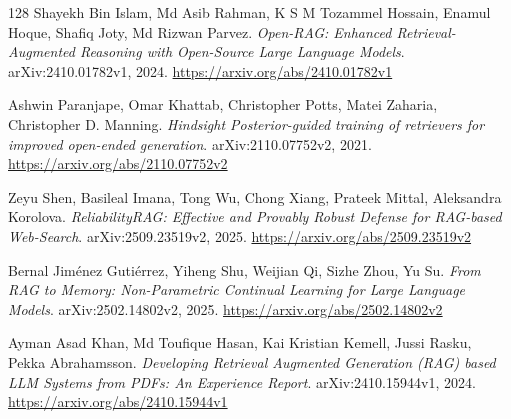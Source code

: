 \documentclass[11pt,a4paper]{article}
\begin{document}
\begin{thebibliography}{128}
Shayekh Bin Islam, Md Asib Rahman, K S M Tozammel Hossain, Enamul Hoque, Shafiq Joty, Md Rizwan Parvez.
\newblock \emph{Open-RAG: Enhanced Retrieval-Augmented Reasoning with Open-Source Large Language Models}.
\newblock arXiv:2410.01782v1, 2024.
\newblock \url{https://arxiv.org/abs/2410.01782v1}

Ashwin Paranjape, Omar Khattab, Christopher Potts, Matei Zaharia, Christopher D. Manning.
\newblock \emph{Hindsight Posterior-guided training of retrievers for improved open-ended generation}.
\newblock arXiv:2110.07752v2, 2021.
\newblock \url{https://arxiv.org/abs/2110.07752v2}

Zeyu Shen, Basileal Imana, Tong Wu, Chong Xiang, Prateek Mittal, Aleksandra Korolova.
\newblock \emph{ReliabilityRAG: Effective and Provably Robust Defense for RAG-based Web-Search}.
\newblock arXiv:2509.23519v2, 2025.
\newblock \url{https://arxiv.org/abs/2509.23519v2}

Bernal Jim\'{e}nez Guti\'{e}rrez, Yiheng Shu, Weijian Qi, Sizhe Zhou, Yu Su.
\newblock \emph{From RAG to Memory: Non-Parametric Continual Learning for Large Language Models}.
\newblock arXiv:2502.14802v2, 2025.
\newblock \url{https://arxiv.org/abs/2502.14802v2}

Ayman Asad Khan, Md Toufique Hasan, Kai Kristian Kemell, Jussi Rasku, Pekka Abrahamsson.
\newblock \emph{Developing Retrieval Augmented Generation (RAG) based LLM Systems from PDFs: An Experience Report}.
\newblock arXiv:2410.15944v1, 2024.
\newblock \url{https://arxiv.org/abs/2410.15944v1}

\end{thebibliography}
\end{document}
